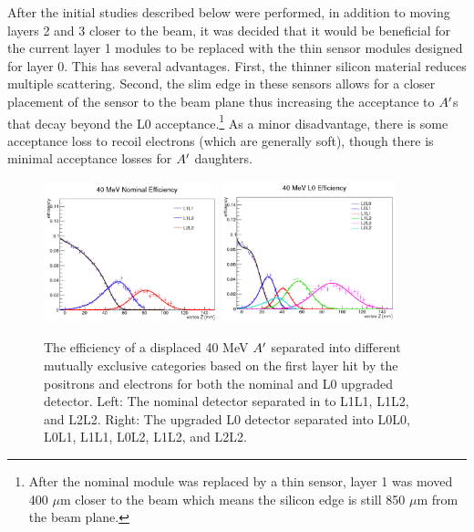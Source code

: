 After the initial studies described below were performed, in addition to moving layers 2 and 3 closer to the beam, it was decided that it would be beneficial for the current layer 1 modules to be replaced with the thin sensor modules designed for layer 0. This has several advantages. First, the thinner silicon material reduces multiple scattering. Second, the slim edge in these sensors allows for a closer placement of the sensor to the beam plane thus increasing the acceptance to $A^\prime$s that decay beyond the L0 acceptance.\footnote{After the nominal module was replaced by a thin sensor, layer 1 was moved 400 $\mu$m closer to the beam which means the silicon edge is still 850 $\mu$m from the beam plane.} As a minor disadvantage, there is some acceptance loss to recoil electrons (which are generally soft), though there is minimal acceptance losses for $A^\prime$ daughters. %

\begin{figure}
    \centering
    \includegraphics[width=0.45\textwidth]{figs/upgrades/40MeV_nominal_eff.png}
    \includegraphics[width=0.45\textwidth]{figs/upgrades/40MeV_L0_eff.png}
    \caption{The efficiency of a displaced 40 MeV $A^\prime$ separated into different mutually exclusive categories based on the first layer hit by the positrons and electrons for both the nominal and L0 upgraded detector. Left: The nominal detector separated in to L1L1, L1L2, and L2L2. Right: The upgraded L0 detector separated into L0L0, L0L1, L1L1, L0L2, L1L2, and L2L2.}
    \label{fig:L0eff}
\end{figure}

